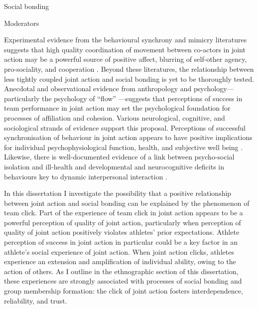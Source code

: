 \begin{CJK}{UTF8}{gbsn}
       Social bonding

       Moderators





Experimental evidence from the behavioural synchrony and mimicry literatures suggests that high quality coordination of movement between co-actors in joint action may be a powerful source of positive affect, blurring of self-other agency, pro-sociality, and cooperation \citep{Mogan2017}. Beyond these literatures, the relationship between less tightly coupled joint action and social bonding is yet to be thoroughly tested.  Anecdotal and observational evidence from anthropology and psychology---particularly the psychology of ``flow'' \citep{Csikszentmihalyi1992,Jackson1999}---suggests that perceptions of success in team performance in joint action may set the psychological foundation for processes of affiliation and cohesion.  Various neurological, cognitive, and sociological strands of evidence support this proposal.  Perceptions of successful synchronisation of behaviour in joint action appears to have positive implications for individual psychophysiological function, health, and subjective well being \citep{Wheatley2012}.  Likewise, there is well-documented evidence of a link between psycho-social isolation and ill-health and developmental and neurocognitive deficits in behaviours key to dynamic interpersonal interaction \citep[e.g.][]{Blakemore2005,Baron-Cohen1991}.

In this dissertation I investigate the possibility that a positive relationship between joint action and social bonding can be explained by the phenomenon of team click.  Part of the experience of team click in joint action appears to be a powerful perception of quality of joint action, particularly when perception of quality of joint action positively violates athletes' prior expectations.  Athlete perception of success in joint action in particular could be a key factor in an athlete's social experience of joint action.  When joint action clicks, athletes experience an extension and amplification of individual ability, owing to the action of others.  As I outline in the ethnographic section of this dissertation, these experiences are strongly associated with processes of social bonding and group membership formation: the click of joint action fosters interdependence, reliability, and trust.


\end{CJK}
